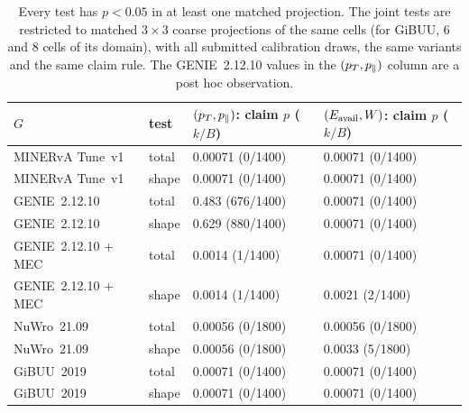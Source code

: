 \begin{table}[htbp]
  \caption[Matched-projection test probabilities]{Every test has $p<0.05$ in at least one matched projection. The joint tests are restricted to matched $3\times3$ coarse projections of the same cells (for GiBUU, 6 and 8 cells of its domain), with all submitted calibration draws, the same variants and the same claim rule. The GENIE~2.12.10 values in the $(p_{T},p_{\parallel})$ column are a post hoc observation.}
  \label{tab:joint5d-projections}
  \centering\small
  \begin{tabular}{@{}llll@{}}
    \toprule
    $G$ & test & $(p_{T},p_{\parallel})$: claim $p$ ($k/B$) & $(E_{\mathrm{avail}},W)$: claim $p$ ($k/B$) \\
    \midrule
    MINERvA Tune~v1     & total & 0.00071 (0/1400) & 0.00071 (0/1400) \\
    MINERvA Tune~v1     & shape & 0.00071 (0/1400) & 0.00071 (0/1400) \\
    GENIE~2.12.10       & total & 0.483 (676/1400) & 0.00071 (0/1400) \\
    GENIE~2.12.10       & shape & 0.629 (880/1400) & 0.00071 (0/1400) \\
    GENIE~2.12.10 + MEC & total & 0.0014 (1/1400)  & 0.00071 (0/1400) \\
    GENIE~2.12.10 + MEC & shape & 0.0014 (1/1400)  & 0.0021 (2/1400) \\
    NuWro~21.09         & total & 0.00056 (0/1800) & 0.00056 (0/1800) \\
    NuWro~21.09         & shape & 0.00056 (0/1800) & 0.0033 (5/1800) \\
    GiBUU~2019          & total & 0.00071 (0/1400) & 0.00071 (0/1400) \\
    GiBUU~2019          & shape & 0.00071 (0/1400) & 0.00071 (0/1400) \\
    \bottomrule
  \end{tabular}
\end{table}

